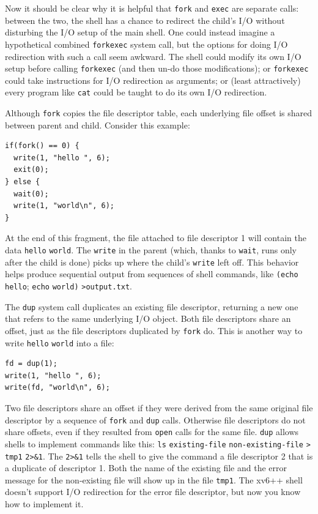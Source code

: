 Now it should be clear why it is helpful that
\lstinline{fork}
and
\lstinline{exec}
are separate calls: between the two, the shell has a chance
to redirect the child's I/O without disturbing the I/O setup of the main shell.
One could instead imagine a hypothetical combined
\lstinline{forkexec} system call,
but the options for doing I/O redirection with such a call
seem awkward.
The shell could modify its own I/O
setup before calling \lstinline{forkexec} (and then
un-do those modifications); or
\lstinline{forkexec} could take instructions for I/O
redirection as arguments;
or (least attractively) every program like \lstinline{cat} could
be taught to do its own I/O redirection.

Although
\lstinline{fork}
copies the file descriptor table, each underlying file offset is shared
between parent and child.
Consider this example:
\begin{lstlisting}[]
if(fork() == 0) {
  write(1, "hello ", 6);
  exit(0);
} else {
  wait(0);
  write(1, "world\n", 6);
}
\end{lstlisting}
At the end of this fragment, the file attached to file descriptor 1
will contain the data
\lstinline{hello}
\lstinline{world}.
The
\lstinline{write}
in the parent
(which, thanks to
\lstinline{wait},
runs only after the child is done)
picks up where the child's
\lstinline{write}
left off.
This behavior helps produce sequential output from sequences
of shell commands, like
\lstinline{(echo}
\lstinline{hello};
\lstinline{echo}
\lstinline{world)}
\lstinline{>output.txt}.

The
\lstinline{dup}
system call duplicates an existing file descriptor,
returning a new one that refers to the same underlying I/O object.
Both file descriptors share an offset, just as the file descriptors
duplicated by
\lstinline{fork}
do.
This is another way to write
\lstinline{hello}
\lstinline{world}
into a file:
\begin{lstlisting}[]
fd = dup(1);
write(1, "hello ", 6);
write(fd, "world\n", 6);
\end{lstlisting}

Two file descriptors share an offset if they were derived from
the same original file descriptor by a sequence of
\lstinline{fork}
and
\lstinline{dup}
calls.
Otherwise file descriptors do not share offsets, even if they
resulted from
\lstinline{open}
calls for the same file.
\lstinline{dup}
allows shells to implement commands like this:
\lstinline{ls}
\lstinline{existing-file}
\lstinline{non-existing-file}
\lstinline{>}
\lstinline{tmp1}
\lstinline{2>&1}.
The
\lstinline{2>&1}
tells the shell to give the command a file descriptor 2 that
is a duplicate of descriptor 1.
Both the name of the existing file and the error message for the
non-existing file will show up in the file
\lstinline{tmp1}.
The xv6++ shell doesn't support I/O redirection for the error file
descriptor, but now you know how to implement it.

